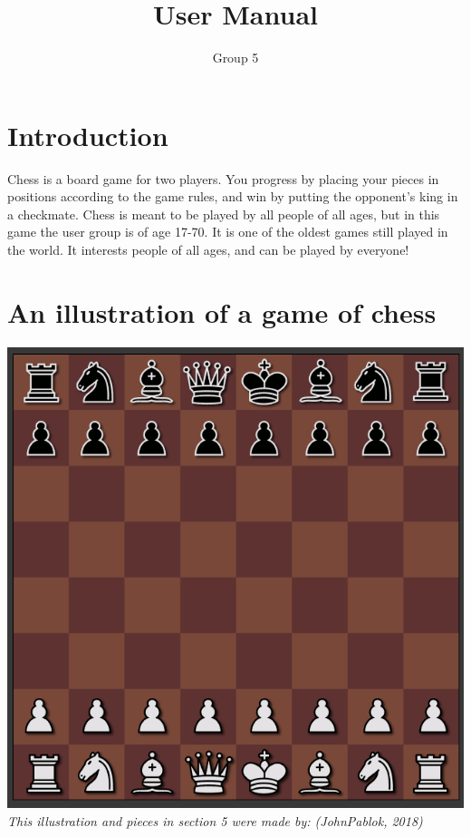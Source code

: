 \documentclass{article}
\title{User Manual}
\author{Group 5}
\date{}
\begin{document}
    \maketitle
    \section{Introduction}
    \noindent
    Chess is a board game for two players. You progress by placing your pieces in positions according to the game rules, and win by putting the opponent's king in a checkmate. Chess is meant to be played by all people of all ages, but in this game the user group is of age 17-70. It is one of the oldest games still played in the world. It interests people of all ages, and can be played by everyone!
    
    \section{An illustration of a game of chess}
	\begin{center}
    	\includegraphics[scale=0.6]{image5.png} \\
    	\textit{This illustration and pieces in section 5 were made by: (JohnPablok, 2018)}
    \end{center}
    
\end{document}
